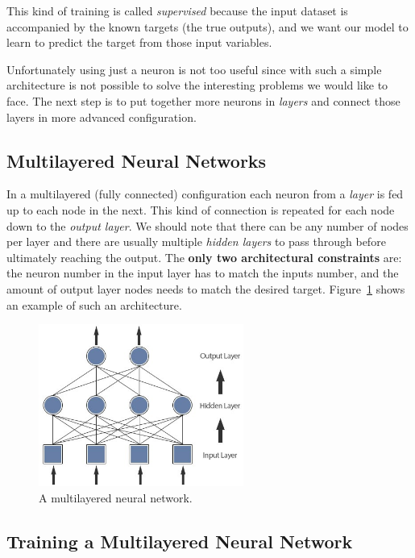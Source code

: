 This kind of training is called \emph{supervised} because the input dataset is accompanied by the known targets (the true outputs), and we want our model to learn to predict the target from those input variables.

Unfortunately using just a neuron is not too useful since with such a simple architecture is not possible to solve the interesting problems we would like to face. 
The next step is to put together more neurons in \emph{layers} and connect those layers in more advanced configuration.

\subsection{Multilayered Neural Networks}
\label{multi-layered-neural-networks}

In a multilayered (fully connected) configuration each neuron from a \emph{layer} is fed up to each node in the next. This kind of connection is repeated for each node down to the \emph{output layer}. 
We should note that there can be any number of nodes per layer and there are usually multiple \emph{hidden layers} to pass through before ultimately reaching the output. The \textbf{only two architectural constraints} are: the neuron number in the input layer has to match the inputs number, and the amount of output layer nodes needs to match the desired target. Figure~\ref{fig:multilayered_nn} shows an example of such an architecture.

\begin{figure}[htb]
\centering
\includegraphics[width=0.6\textwidth]{figures/multilayer.jpeg}
\caption{A multilayered neural network.}
\label{fig:multilayered_nn}
\end{figure}

\subsection{Training a Multilayered Neural Network}
\label{training-a-multilayered-neural-network}

